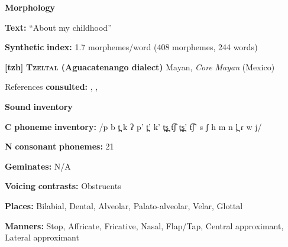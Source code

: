 \documentclass[output=paper]{langsci/langscibook}
\begin{document}
\begin{styleBody}
\textbf{Morphology}
\end{styleBody}

\begin{styleBody}
\textbf{Text:} “About my childhood” \citep[248-250]{Yumitani1998}
\end{styleBody}

\begin{styleBody}
\textbf{Synthetic} \textbf{index:} 1.7 morphemes/word (408 morphemes, 244 words)
\end{styleBody}

\begin{styleBody}
\textbf{[tzh]}   \textbf{\textsc{Tzeltal} \textbf{(Aguacatenango} \textbf{dialect)}}  Mayan, \textit{Core} \textit{Mayan} (Mexico)
\end{styleBody}

\begin{styleBody}
References \textbf{consulted:} \citet{Kaufman1971}, \citet{Polian2006}, \citet{Smith2007}
\end{styleBody}

\begin{styleBody}
\textbf{Sound} \textbf{inventory}
\end{styleBody}

\begin{styleBody}
\textbf{C} \textbf{phoneme} \textbf{inventory:} /p b t̪ k ʔ p’ t̪’ k’ t̪s̪ t͡ʃ t̪s̪’ t͡ʃ’ s ʃ h m n l̪ ɾ w j/
\end{styleBody}

\begin{styleBody}
\textbf{N} \textbf{consonant} \textbf{phonemes:} 21
\end{styleBody}

\begin{styleBody}
\textbf{Geminates:} N/A
\end{styleBody}

\begin{styleBody}
\textbf{Voicing} \textbf{contrasts:} Obstruents
\end{styleBody}

\begin{styleBody}
\textbf{Places:} Bilabial, Dental, Alveolar, Palato-alveolar, Velar, Glottal
\end{styleBody}

\begin{styleBody}
\textbf{Manners:} Stop, Affricate, Fricative, Nasal, Flap/Tap, Central approximant, Lateral approximant
\end{styleBody}
\end{document}
